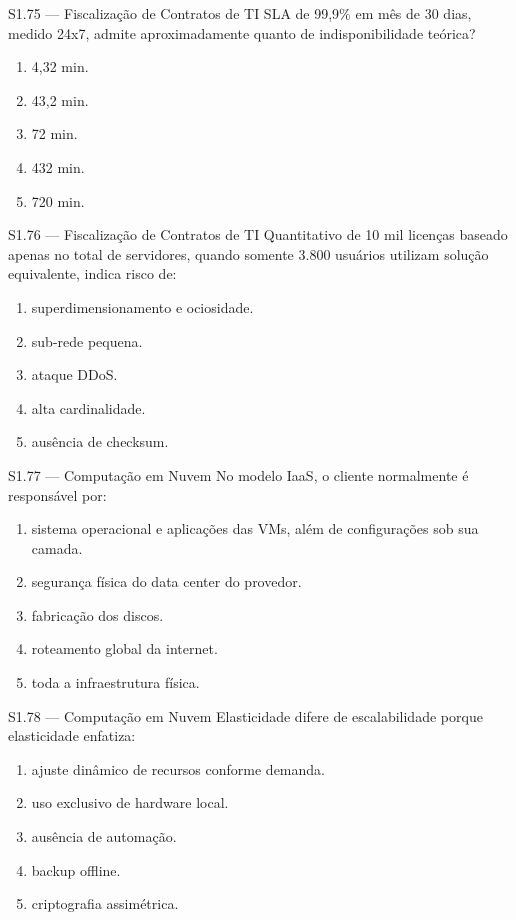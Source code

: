 \begin{questao}{S1.75 — Fiscalização de Contratos de TI}
SLA de 99,9\% em mês de 30 dias, medido 24x7, admite aproximadamente quanto de indisponibilidade teórica?
\begin{enumerate}[label=\Alph*)]\item 4,32 min.\item 43,2 min.\item 72 min.\item 432 min.\item 720 min.\end{enumerate}
\end{questao}

\begin{questao}{S1.76 — Fiscalização de Contratos de TI}
Quantitativo de 10 mil licenças baseado apenas no total de servidores, quando somente 3.800 usuários utilizam solução equivalente, indica risco de:
\begin{enumerate}[label=\Alph*)]\item superdimensionamento e ociosidade.\item sub-rede pequena.\item ataque DDoS.\item alta cardinalidade.\item ausência de checksum.\end{enumerate}
\end{questao}

\begin{questao}{S1.77 — Computação em Nuvem}
No modelo IaaS, o cliente normalmente é responsável por:
\begin{enumerate}[label=\Alph*)]\item sistema operacional e aplicações das VMs, além de configurações sob sua camada.\item segurança física do data center do provedor.\item fabricação dos discos.\item roteamento global da internet.\item toda a infraestrutura física.\end{enumerate}
\end{questao}

\begin{questao}{S1.78 — Computação em Nuvem}
Elasticidade difere de escalabilidade porque elasticidade enfatiza:
\begin{enumerate}[label=\Alph*)]\item ajuste dinâmico de recursos conforme demanda.\item uso exclusivo de hardware local.\item ausência de automação.\item backup offline.\item criptografia assimétrica.\end{enumerate}
\end{questao}

